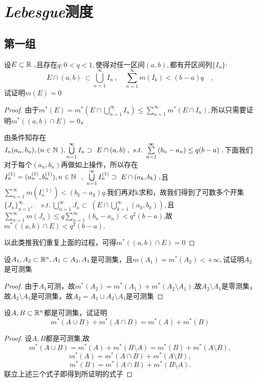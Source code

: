 \chapter{\emph{Lebesgue}测度}
\section{第一组}
设$E\subset \R{R}{\ },$且存在$q:0<q<1,$使得对任一区间$(a,b),$都有开区间列$\{I_n\}:$ $$E\cap (a,b)\ \subset   \bigcup\limits_{n=1}^{\infty}I_n\ ,\quad \sum_{n=1}^{\infty}m(I_k)<(b-a)q\quad,$$试证明$m(E)=0$
\begin{proof}
	由于$m^*(E)=m^*\left( E\cap \bigcup\limits_{n=1}^{\infty}I_n\right)\leq \sum\limits_{n=1}^{\infty}m^*\left( E\cap I_n\right) ,$所以只需要证明$m^*\left( (a,b)\cap E\right)=0，$\par 
	由条件知存在$I_n(a_n,b_n),(n\in \R{N}{\ }),   \bigcup\limits_{n=1}^{\infty}I_n\supset\ E\cap (a,b)\ , \ s.t.\ \sum\limits_{n=1}^{\infty}\left(b_n-a_n \right)\leq q(b-a)\ .$下面我们对于每个$(a_n,b_n)$再做如上操作，所以存在$I_n^{(1)}=(a_n^{(1)},b_n^{(1)}),n\in\R{N}{\ }\ ,\ \bigcup\limits_{n=1}^{\infty}I_n^{(1)}\supset\ E\cap (a_k,b_k)\ ,$且$\sum\limits_{n=1}^{\infty}m(I_n^{(1)})<(b_k-a_k)q$.我们再对k求和，故我们得到了可数多个开集$\{J_n\}_{n=1}^{\infty},\quad s.t.\ \bigcup\limits_{n=1}^{\infty}J_n\subset\ \left( E\cap\bigcup\limits_{k=1}^{\infty}(a_k,b_k)\right) ,$且$\sum\limits_{n=1}^{\infty}m(J_n)\leq q\sum\limits_{n=1}^{\infty}(b_n-a_n)<q^2(b-a)$,故$m^*\left( (a,b)\cap E\right)<q^2(b-a).$\par 以此类推我们重复上面的过程，可得$m^*\left( (a,b)\cap E\right)=0$
\end{proof}


设$A_1,A_2\subset\mathbb{R}^{n},A_1\subset A_2,A_1$是可测集，且$m(A_1)=m^*(A_2)<+\infty,$试证明$A_2$是可测集
\begin{proof}
	由于$A_1$可测，故$m^*(A_2)=m^*(A_1)+m^*(A_2\setminus A_1)$,故$A_2\setminus A_1$是零测集，故$A_2\setminus A_1$是可测集，故$A_2=A_1\cup A_2\setminus A_1$是可测集
\end{proof}


设$A,B\subset\mathbb{R}^{n}$都是可测集，试证明$$m^*(A\cup B)+m^*(A\cap B)=m^*(A)+m^*(B)$$
\begin{proof}
	设$A,B$都是可测集,故$$m^*(A\cup B)=m^*(A)+m^*(B\setminus A)=m^*(B)+m^*(A\setminus B),$$$$ m^*(A)=m^*(A\cap B)+m^*(A\setminus B),$$$$m^*(B)=m^*(A\cap B)+m^*(B\setminus A).$$联立上述三个式子即得到所证明的式子
\end{proof}


